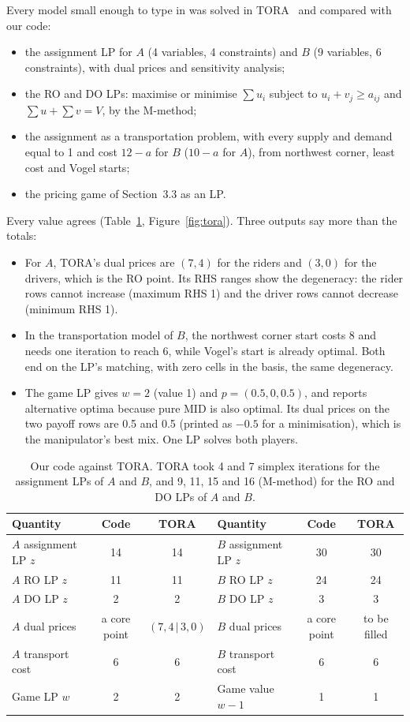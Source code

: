 \documentclass[11pt,a4paper]{article}
\begin{document}
Every model small enough to type in was solved in TORA~\cite{taha} and compared with our code:
\begin{itemize}
  \item the assignment LP for $A$ (4 variables, 4 constraints) and $B$ (9 variables, 6 constraints), with dual prices and sensitivity analysis;
  \item the RO and DO LPs: maximise or minimise $\sum u_i$ subject to $u_i+v_j\ge a_{ij}$ and $\sum u+\sum v=V$, by the M-method;
  \item the assignment as a transportation problem, with every supply and demand equal to 1 and cost $12-a$ for $B$ ($10-a$ for $A$), from northwest corner, least cost and Vogel starts;
  \item the pricing game of Section~3.3 as an LP.
\end{itemize}
Every value agrees (Table~\ref{tab:tora}, Figure~\ref{fig:tora}). Three outputs say more than the totals:
\begin{itemize}
  \item For $A$, TORA's dual prices are $(7,4)$ for the riders and $(3,0)$ for the drivers, which is the RO point. Its RHS ranges show the degeneracy: the rider rows cannot increase (maximum RHS 1) and the driver rows cannot decrease (minimum RHS 1).
  \item In the transportation model of $B$, the northwest corner start costs 8 and needs one iteration to reach 6, while Vogel's start is already optimal. Both end on the LP's matching, with zero cells in the basis, the same degeneracy.
  \item The game LP gives $w=2$ (value 1) and $p=(0.5,0,0.5)$, and reports alternative optima because pure MID is also optimal. Its dual prices on the two payoff rows are 0.5 and 0.5 (printed as $-0.5$ for a minimisation), which is the manipulator's best mix. One LP solves both players.
\end{itemize}

\begin{table}[h]
\centering\small
\begin{tabular}{lcc@{\hspace{2.5em}}lcc}
\toprule
Quantity & Code & TORA & Quantity & Code & TORA \\
\midrule
$A$ assignment LP $z$ & 14 & 14 & $B$ assignment LP $z$ & 30 & 30 \\
$A$ RO LP $z$      & 11 & 11 & $B$ RO LP $z$      & 24 & 24 \\
$A$ DO LP $z$      & 2  & 2  & $B$ DO LP $z$      & 3  & 3 \\
$A$ dual prices    & a core point & $(7,4\,|\,3,0)$ & $B$ dual prices & a core point & to be filled \\
$A$ transport cost & 6  & 6 & $B$ transport cost & 6  & 6 \\
Game LP $w$        & 2  & 2 & Game value $w-1$   & 1  & 1 \\
\bottomrule
\end{tabular}
\caption{Our code against TORA. TORA took 4 and 7 simplex iterations for the assignment LPs of $A$ and $B$, and 9, 11, 15 and 16 (M-method) for the RO and DO LPs of $A$ and $B$.}
\label{tab:tora}
\end{table}
\end{document}
